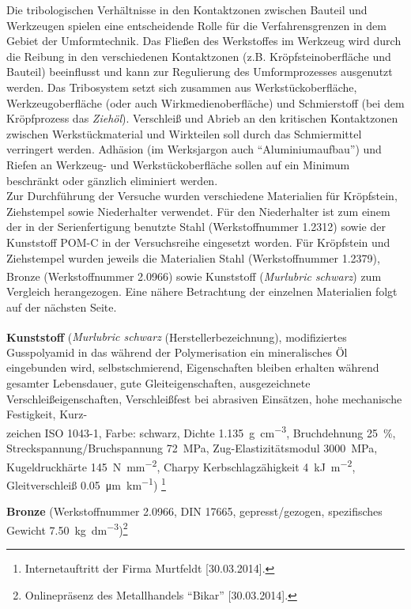 \documentclass[12pt,a4paper,parskip,twoside,BCOR5mm,headsepline]{scrartcl}
\begin{document}
\begin{description*}
Die tribologischen Verhältnisse in den Kontaktzonen zwischen Bauteil und Werkzeugen spielen eine entscheidende Rolle für die Verfahrensgrenzen in dem Gebiet der Umformtechnik. Das Fließen des Werkstoffes im Werkzeug wird durch die Reibung in den verschiedenen Kontaktzonen (z.B. Kröpfsteinoberfläche und Bauteil) beeinflusst und kann zur Regulierung des Umformprozesses ausgenutzt werden. Das Tribosystem setzt sich zusammen aus Werkstückoberfläche, Werkzeugoberfläche (oder auch Wirkmedienoberfläche) und Schmierstoff (bei dem Kröpfprozess das \emph{Ziehöl}). Verschleiß und Abrieb  an den kritischen Kontaktzonen zwischen Werkstückmaterial und Wirkteilen soll durch das Schmiermittel verringert werden. Adhäsion (im Werksjargon auch "`Aluminiumaufbau"') und Riefen  an Werkzeug- und Werkstückoberfläche sollen auf ein Minimum beschränkt oder gänzlich eliminiert werden. \autocite[516]{aa}\\
Zur Durchführung der Versuche wurden verschiedene Materialien für Kröpfstein, Ziehstempel sowie Niederhalter verwendet. Für den Niederhalter ist zum einem der in der Serienfertigung benutzte Stahl (Werkstoffnummer 1.2312) sowie der Kunststoff POM-C in der Versuchsreihe eingesetzt worden. Für Kröpfstein und Ziehstempel wurden jeweils die Materialien Stahl (Werkstoffnummer 1.2379), Bronze (Werkstoffnummer 2.0966) sowie Kunststoff (\emph{Murlubric\textsuperscript{\textregistered} schwarz}) zum Vergleich herangezogen. Eine nähere Betrachtung der einzelnen Materialien folgt auf der nächsten Seite.
\newpage
\begin{itemize*}
\item \textbf{Kunststoff} (\emph{Murlubric\textsuperscript{\textregistered} schwarz} (Herstellerbezeichnung), modifiziertes Gusspolyamid in das während der Polymerisation ein mineralisches Öl eingebunden wird, selbstschmierend, Eigenschaften bleiben erhalten während gesamter Lebensdauer, gute Gleiteigenschaften, ausgezeichnete Verschleißeigenschaften, Verschleißfest bei abrasiven Einsätzen, hohe mechanische Festigkeit, Kurz-\\zeichen ISO 1043-1, Farbe: schwarz, Dichte \SI{1,135}{\gram\per\centi\meter\cubed}, Bruchdehnung \SI{25}{\percent}, Streckspannung/Bruchspannung \SI{72}{\mega\pascal}, Zug-Elastizitätsmodul \SI{3000}{\mega\pascal}, Kugeldruckhärte \SI{145}{\newton\per\milli\meter\squared},  Charpy Kerbschlagzähigkeit
 \SI{4}{\kilo\joule\per\meter\squared}, Gleitverschleiß \SI{0,05}{\micro\meter\per\kilo\meter})
\footnote{Internetauftritt der Firma Murtfeldt [30.03.2014].}
\item \textbf{Bronze} (Werkstoffnummer 2.0966, DIN 17665, gepresst/gezogen, spezifisches Gewicht \SI{7.50}{\kilo\gram\per\deci\meter\cubed})\footnote{Onlinepräsenz des Metallhandels "`Bikar"' [30.03.2014].}

\end{itemize*}
\end{description*}
\end{document}
